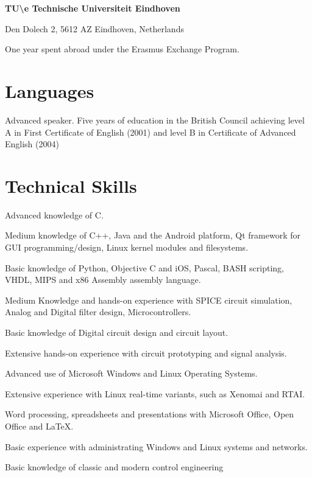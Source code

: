 \vspace{\baselineskip}


{
\textbf{TU\textbackslash e Technische Universiteit Eindhoven}

Den Dolech 2, 5612 AZ Eindhoven, Netherlands
}

{
One year spent abroad under the Erasmus Exchange Program.
}


\section*{Languages}


{
Advanced speaker. Five years of education in the British Council achieving
level A in First Certificate of English (2001) and level B in Certificate of
Advanced English (2004)
}



\section*{Technical Skills}

{
Advanced knowledge of C.
			
Medium knowledge of C++, Java and the Android platform, Qt framework for GUI
programming/design, Linux kernel modules and filesystems.
			
Basic knowledge of Python, Objective C and iOS, Pascal, BASH scripting, VHDL,
MIPS and x86 Assembly assembly language.
}

{
Medium Knowledge and hands-on experience with SPICE circuit simulation, Analog
and Digital filter design, Microcontrollers.
			 
Basic knowledge of Digital circuit design and circuit layout.

Extensive hands-on experience with circuit prototyping and signal analysis.
}

{
Advanced use of Microsoft Windows and Linux Operating Systems.

Extensive experience with Linux real-time variants, such as Xenomai and RTAI.

Word processing, spreadsheets and presentations with Microsoft Office, Open
Office and \LaTeX.

Basic experience with administrating Windows and Linux systems and networks.

Basic knowledge of classic and modern control engineering
}


